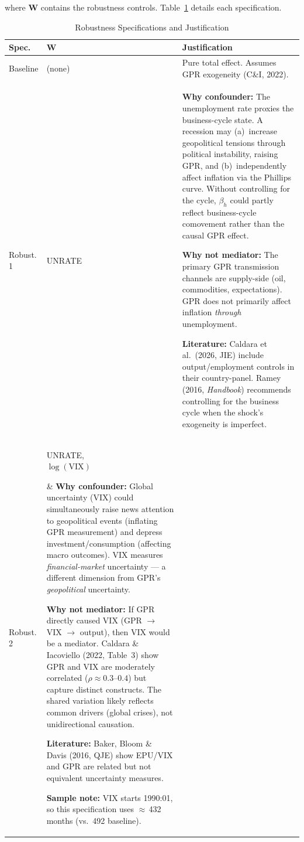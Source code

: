 \documentclass[11pt,a4paper]{article}
\begin{document}
\noindent where $\mathbf{W}$ contains the robustness controls. Table~\ref{tab:robust} details each specification.

\begin{table}[H]
\centering
\caption{Robustness Specifications and Justification}
\label{tab:robust}
\small
\begin{tabular}{@{}l l p{10cm}@{}}
\toprule
\textbf{Spec.} & $\mathbf{W}$ & \textbf{Justification} \\
\midrule
Baseline & (none) & Pure total effect. Assumes GPR exogeneity (C\&I, 2022). \\
\addlinespace
Robust.\,1 & UNRATE &
\textbf{Why confounder:} The unemployment rate proxies the business-cycle state. A recession may (a)~increase geopolitical tensions through political instability, raising GPR, and (b)~independently affect inflation via the Phillips curve. Without controlling for the cycle, $\beta_h$ could partly reflect business-cycle comovement rather than the causal GPR effect. \par
\textbf{Why not mediator:} The primary GPR transmission channels are supply-side (oil, commodities, expectations). GPR does not primarily affect inflation \textit{through} unemployment. \par
\textbf{Literature:} Caldara et al.\ (2026, JIE) include output/employment controls in their country-panel. Ramey (2016, \textit{Handbook}) recommends controlling for the business cycle when the shock's exogeneity is imperfect. \\
\addlinespace
Robust.\,2 & \parbox[t]{1.8cm}{UNRATE,\\$\log(\text{VIX})$} &
\textbf{Why confounder:} Global uncertainty (VIX) could simultaneously raise news attention to geopolitical events (inflating GPR measurement) and depress investment/consumption (affecting macro outcomes). VIX measures \textit{financial-market} uncertainty --- a different dimension from GPR's \textit{geopolitical} uncertainty. \par
\textbf{Why not mediator:} If GPR directly caused VIX (GPR $\to$ VIX $\to$ output), then VIX would be a mediator. Caldara \& Iacoviello (2022, Table~3) show GPR and VIX are moderately correlated ($\rho \approx 0.3$--$0.4$) but capture distinct constructs. The shared variation likely reflects common drivers (global crises), not unidirectional causation. \par
\textbf{Literature:} Baker, Bloom \& Davis (2016, QJE) show EPU/VIX and GPR are related but not equivalent uncertainty measures. \par
\textbf{Sample note:} VIX starts 1990:01, so this specification uses $\approx$\,432 months (vs.\ 492 baseline). \\
\bottomrule
\end{tabular}
\end{table}
\end{document}
